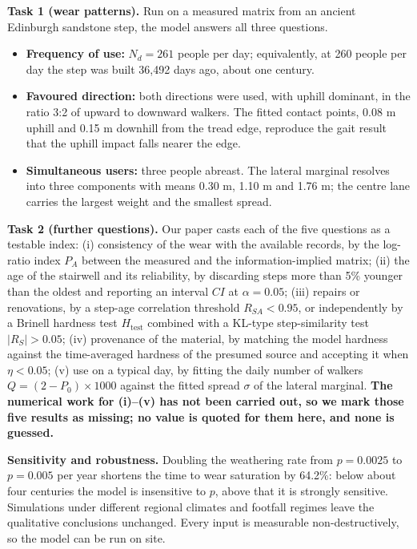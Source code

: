 \documentclass[12pt]{article}
\begin{document}
\textbf{Task 1 (wear patterns).} Run on a measured matrix from an ancient Edinburgh sandstone
step, the model answers all three questions.

\begin{itemize}
\setlength{\itemsep}{1pt}
\item \textbf{Frequency of use:} $N_d=261$ people per day; equivalently, at 260 people per day the
step was built 36,492 days ago, about one century.
\item \textbf{Favoured direction:} both directions were used, with uphill dominant, in the ratio
3:2 of upward to downward walkers. The fitted contact points, 0.08 m uphill and 0.15 m downhill
from the tread edge, reproduce the gait result that the uphill impact falls nearer the edge.
\item \textbf{Simultaneous users:} three people abreast. The lateral marginal resolves into three
components with means 0.30 m, 1.10 m and 1.76 m; the centre lane carries the largest weight and
the smallest spread.
\end{itemize}

\textbf{Task 2 (further questions).} Our paper casts each of the five questions as a testable
index: (i) consistency of the wear with the available records, by the log-ratio index $P_A$
between the measured and the information-implied matrix; (ii) the age of the stairwell and its
reliability, by discarding steps more than 5\% younger than the oldest and reporting an interval
$CI$ at $\alpha=0.05$; (iii) repairs or renovations, by a step-age correlation threshold
$R_{SA}<0.95$, or independently by a Brinell hardness test $H_{\text{test}}$ combined with a
KL-type step-similarity test $|R_S|>0.05$; (iv) provenance of the material, by matching the model
hardness against the time-averaged hardness of the presumed source and accepting it when
$\eta<0.05$; (v) use on a typical day, by fitting the daily number of walkers
$Q=(2-P_0)\times1000$ against the fitted spread $\sigma$ of the lateral marginal. \textbf{The
numerical work for (i)--(v) has not been carried out, so we mark those five results as missing;
no value is quoted for them here, and none is guessed.}

\textbf{Sensitivity and robustness.} Doubling the weathering rate from $p=0.0025$ to
$p=0.005$ per year shortens the time to wear saturation by 64.2\%: below about four centuries the
model is insensitive to $p$, above that it is strongly sensitive. Simulations under different
regional climates and footfall regimes leave the qualitative conclusions unchanged. Every input
is measurable non-destructively, so the model can be run on site.

\end{document}
